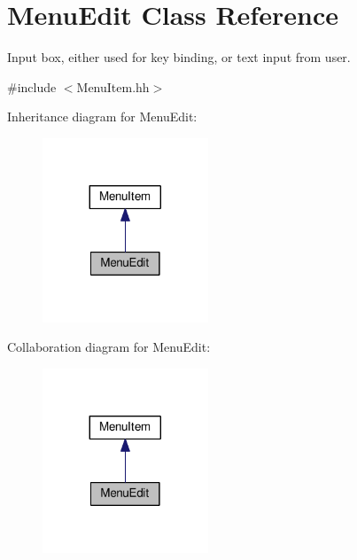 \hypertarget{classMenuEdit}{}\section{Menu\+Edit Class Reference}
\label{classMenuEdit}


Input box, either used for key binding, or text input from user.  




{\ttfamily \#include $<$Menu\+Item.\+hh$>$}



Inheritance diagram for Menu\+Edit\+:\nopagebreak
\begin{figure}[H]
\begin{center}
\leavevmode
\includegraphics[width=140pt]{classMenuEdit__inherit__graph}
\end{center}
\end{figure}


Collaboration diagram for Menu\+Edit\+:\nopagebreak
\begin{figure}[H]
\begin{center}
\leavevmode
\includegraphics[width=140pt]{classMenuEdit__coll__graph}
\end{center}
\end{figure}
